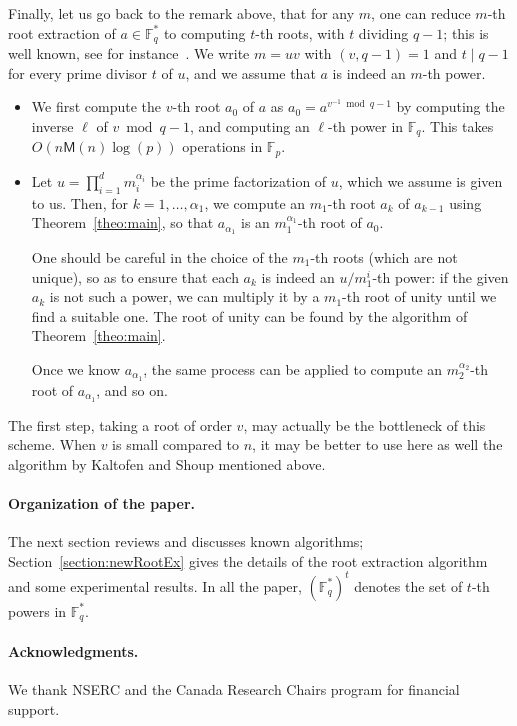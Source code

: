 \documentclass[12pt]{article}
\theoremstyle{plain}
\theoremstyle{definition}
\def\F{\mathbb{F}}
\def\M{\mathsf{M}}
\newcounter{algorithm}
\begin{document}
Finally, let us go back to the remark above, that for any $m$, one can
reduce $m$-th root extraction of $a \in \F_q^*$ to computing $t$-th
roots, with $t$ dividing $q-1$; this is well known, see for
instance~\cite[Chapter~7.3]{BachSh1996}. We write $m = uv$ with $(v, q
- 1) = 1$ and $t \mid q - 1$ for every prime divisor $t$ of $u$, and
we assume that $a$ is indeed an $m$-th power.
\begin{itemize}
\item We first compute the $v$-th root $a_0$ of $a$ as
  $a_0=a^{v^{-1} \bmod q - 1}$ by computing the inverse $\ell$ of
  $v \bmod q-1$, and computing an $\ell$-th power in $\F_q$. This
  takes $O(n\M(n)\log(p))$ operations in $\F_p$.
\item Let $u = \prod_{i = 1}^d{m_i^{\alpha_i}}$ be the prime
  factorization of $u$, which we assume is given to us. Then, for $k =
  1, \dots, \alpha_1$, we compute an $m_1$-th root $a_k$ of $a_{k-1}$
  using Theorem~\ref{theo:main}, so that $a_{\alpha_1}$ is an
  $m_1^{\alpha_1}$-th root of $a_0$.

  One should be careful in the choice of the $m_1$-th roots (which are
  not unique), so as to ensure that each $a_k$ is indeed an
  $u/m_1^i$-th power: if the given $a_k$ is not such a power, we can
  multiply it by a $m_1$-th root of unity until we find a suitable
  one.  The root of unity can be found by the algorithm of
  Theorem~\ref{theo:main}.

  Once we know $a_{\alpha_1}$, the same process can be applied to
  compute an $m_2^{\alpha_2}$-th root of $a_{\alpha_1}$, and so on.
\end{itemize}

The first step, taking a root of order $v$, may actually be the
bottleneck of this scheme. When $v$ is small compared to $n$, it may
be better to use here as well the algorithm by Kaltofen and Shoup
mentioned above.



\paragraph{Organization of the paper.} 
The next section reviews and discusses known algorithms;
Section~\ref{section:newRootEx} gives the details of the root
extraction algorithm and some experimental results. In all the paper,
$(\F_q^*)^t$ denotes the set of $t$-th powers in $\F_q^*$.

\paragraph{Acknowledgments.} We thank NSERC and the Canada Research
Chairs program for financial support.
\end{document}
